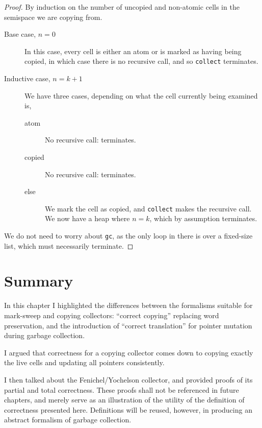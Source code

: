 \begin{proof}
  By induction on the number of uncopied and non-atomic cells in the
  semispace we are copying from.

  \begin{description}
  \item[Base case, $n = 0$] In this case, every cell is either an atom
    or is marked as having being copied, in which case there is no
    recursive call, and so \texttt{collect} terminates.

  \item[Inductive case, $n = k + 1$] We have three cases, depending on
    what the cell currently being examined is,

    \begin{description}
    \item[atom] No recursive call: terminates.
    \item[copied] No recursive call: terminates.
    \item[else] We mark the cell as copied, and \texttt{collect} makes
      the recursive call. We now have a heap where $n = k$, which by
      assumption terminates.
    \end{description}
  \end{description}

  We do not need to worry about \texttt{gc}, as the only loop in there
  is over a fixed-size list, which must necessarily terminate.
\end{proof}

\section{Summary}
\label{sec:copying-summary}

In this chapter I highlighted the differences between the formalisms
suitable for \gls{mark-sweep} and \gls{copying} \glspl{collector}:
``correct copying'' replacing word preservation, and the introduction
of ``correct translation'' for \gls{pointer} mutation during
\gls{garbage collection}.

I argued that correctness for a \gls{copying} \gls{collector} comes
down to copying exactly the \glspl{live cell} and updating all
\glspl{pointer} consistently.

I then talked about the Fenichel/Yochelson\cite{Fenichel69} collector,
and provided proofs of its partial and total correctness. These proofs
shall not be referenced in future chapters, and merely serve as an
illustration of the utility of the definition of correctness presented
here. Definitions will be reused, however, in producing an abstract
formalism of garbage collection.
